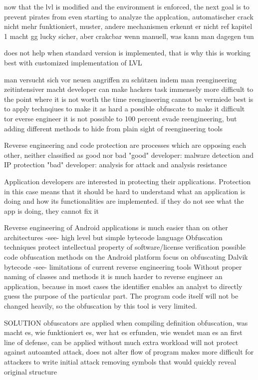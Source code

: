 now that the lvl is modified and the environment is enforced, the next goal is to prevent pirates from even starting to analyze the applcation, automatischer crack nicht mehr funktioniert, muster, andere mechanismen erkennt er nicht
ref kapitel 1 macht gg lucky sicher, aber crakcbar wenn manuell, was kann man dagegen tun

does not help when standard version is implemented, that is why this is working best with customized implementation of LVL

man versucht sich vor neuen angriffen zu schützen indem man reengineering zeitintensiver macht
developer can make hackers task immensely more difficult to the point where it is not worth the time\cite{developersSecuring}
reengineering cannot be vermiede\cite{munteanLicense}
best is to apply technqiues to make it as hard a possible\cite{munteanLicense}
obfuscate to make it difficult tor everse engineer\cite{developersSecuring}
it is not possible to 100 percent evade reengineering, but adding different methods to hide from plain sight of reengineering tools\cite{munteanLicense}

Reverse engineering and code protection are processes which are opposing each other, neither classified as good nor bad\cite{kovachevaMaster}
"good" developer: malware detection and IP protection\cite{kovachevaMaster}
"bad" developer: analysis for attack and analysis resistance\cite{kovachevaMaster}
\cite{kovachevaMaster}

Application developers are interested in protecting their applications. Protection in this case means that it should be hard to understand
what an application is doing and how its functionalities are implemented.
if they do not see what the app is doing, they cannot fix it

Reverse engineering of Android applications is much easier than on other architectures -see- high level but simple bytecode language
Obfuscation techniques protect intellectual property of software/license verification
possible code obfuscation methods on the Android platform focus on obfuscating Dalvik bytecode -see- limitations of current reverse engineering tools
Without proper naming of classes and methods it is much harder to reverse engineer an application, because in most cases the identifier enables an analyst to directly guess the purpose of the particular part. The program code itself will not be changed heavily, so the obfuscation by this tool is very limited.


SOLUTION
obfuscators are applied when compiling
definition obfuscation, was macht es, wie funktioniert es, wer hat es erfunden, wie wendet man es an\newline
first line of defense, can be applied without much extra workload\cite{developersSecuring}
will not protect against autoamted attack, does not alter flow of program\cite{developersSecuring}
makes more difficult for attackers to write initial attack\cite{developersSecuring}
removing symbols that would quickly reveal original structure\cite{developersSecuring}

